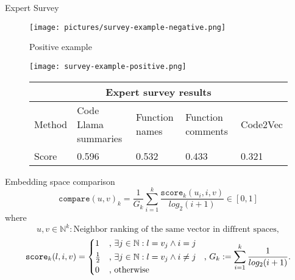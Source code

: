 \documentclass[aspectratio=1610,12pt]{beamer}
\begin{document}
\begin{frame}[t]{Expert Survey}
    \begin{figure}
      \centering
      \begin{minipage}{0.45\textwidth}
          \centering
          \texttt{[image: pictures/survey-example-negative.png]}
          \caption{Positive example}
      \end{minipage}
      \begin{minipage}{0.45\textwidth}
          \centering
          \texttt{[image: survey-example-positive.png]}
          \caption{Negative example}
      \end{minipage}
      \begin{table}
        \begin{center}
          \scalebox{0.8} {
            \begin{tabular}{ |p{1.5cm}||p{4.5cm}|p{3.2cm}|p{4cm}|p{1.8cm}|  }
            \hline
            \multicolumn{5}{|c|}{Expert survey results} \\
            \hline
            Method & Code Llama summaries & Function names & Function comments
                   & Code2Vec \\
            \hline
            Score   & 0.596 & 0.532 & 0.433 & 0.321   \\
            \hline
            \end{tabular}
          }
        \end{center} 
      \end{table}
    \end{figure}
\end{frame}

\begin{frame}[t]{Embedding space comparison}
  \[
    \texttt{compare}(u,v)_k = 
      \frac{1}{G_k} \sum^{k}_{i=1} 
      \frac{ \texttt{score}_{k}(u_i,i,v)}{log_2(i+1)} 
      \in [0,1]
  \]
  where
  \[ u,v \in \mathbb{N}^k: \text{Neighbor ranking of the same vector in diffrent spaces},\]
  \[
    \texttt{score}_k(l,i,v) = \begin{cases*} 
        1 & , $\exists j \in \mathbb{N}: l = v_j \land i = j$   \\
        \frac{1}{2} & , $\exists j \in \mathbb{N}: l = v_j \land i \neq j$\\
        0   & , \text{otherwise}
      \end{cases*}  \text{  , }
      G_k := \sum_{i=1}^{k} \frac{1}{log_2(i+1)}.
  \]
\end{frame}
\end{document}
